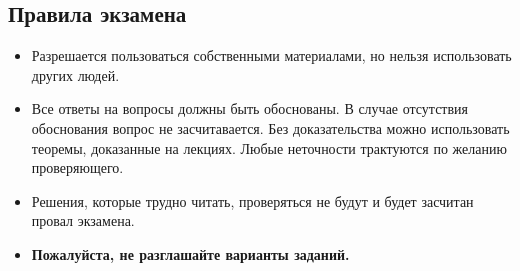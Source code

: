 \renewcommand{\coursetitle}{\textsc{Ex}}


\subsection*{Правила экзамена}

\begin{itemize}
    \item Разрешается пользоваться собственными материалами, но нельзя использовать других людей.
    \item Все ответы на вопросы должны быть обоснованы. В случае отсутствия обоснования вопрос не
        засчитавается. Без доказательства можно использовать теоремы, доказанные на лекциях. Любые
        неточности трактуются по желанию проверяющего.
    \item Решения, которые трудно читать, проверяться не будут и будет засчитан провал экзамена.
    \item \textbf{Пожалуйста, не разглашайте варианты заданий.}
\end{itemize}

\vspace{1cm}